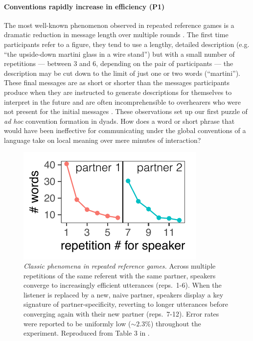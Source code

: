\paragraph{Conventions rapidly increase in efficiency (\textbf{P1})}

The most well-known phenomenon observed in repeated reference games is a dramatic reduction in message length over multiple rounds \cite{krauss_changes_1964, ClarkWilkesGibbs86_ReferringCollaborative, hawkins2020characterizing}. 
The first time participants refer to a figure, they tend to use a lengthy, detailed description (e.g. ``the upside-down martini glass in a wire stand'') but with a small number of repetitions --- between 3 and 6, depending on the pair of participants --- the description may be cut down to the limit of just one or two words (``martini''). 
These final messages are as short or shorter than the messages participants produce when they are instructed to generate descriptions for themselves to interpret in the future \cite{FussellKrauss89_IntendedAudienceCommonGround} and are often incomprehensible to overhearers who were not present for the initial messages \cite{SchoberClark89_Overhearers}.
These observations set up our first puzzle of \emph{ad hoc} convention formation in dyads.
How does a word or short phrase that would have been ineffective for communicating under the global conventions of a language take on local meaning over mere minutes of interaction? 

\begin{figure}[t!]
\centering
\includegraphics[scale=1.2]{./figures/clark92}
\vspace{1em}
\caption{\textit{Classic phenomena in repeated reference games.} Across multiple repetitions of the same referent with the same partner, speakers converge to increasingly efficient utterances (reps.~1-6). When the listener is  replaced by a new, naive partner, speakers display a key signature of partner-specificity, reverting to longer utterances before converging again with their new partner (reps.~7-12). Error rates were reported to be uniformly low ($\sim 2.3\%$) throughout the experiment. Reproduced from Table 3 in \protect{}.}
\label{fig:clark92}
\end{figure}

